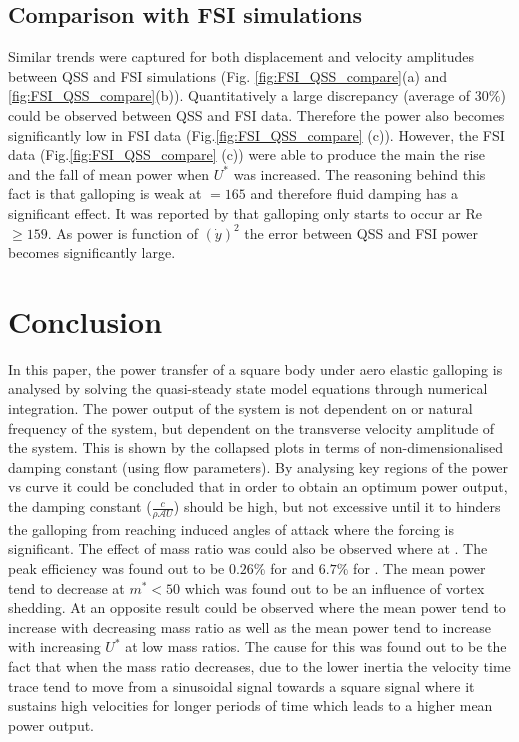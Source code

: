 \subsection{Comparison with FSI simulations}
 Similar trends were captured for both displacement and velocity amplitudes between QSS and FSI simulations (Fig. \ref{fig:FSI_QSS_compare}(a) and \ref{fig:FSI_QSS_compare}(b)). Quantitatively a large discrepancy (average of $30\%$) could be observed between QSS and FSI data. Therefore the power also becomes significantly low in FSI data (Fig.\ref{fig:FSI_QSS_compare} (c)). However, the FSI data (Fig.\ref{fig:FSI_QSS_compare} (c)) were able to produce the main the rise and the fall of mean power when $U^*$ was increased. The reasoning behind this fact is that galloping is weak at \reynoldsnumber$=165$  and therefore fluid damping has a significant effect. It was reported by \cite{Barrero-Gil2009} that galloping only starts to occur ar Re $\geq 159$. As power is function of $(\dot{y})^2$ the error between QSS and FSI power becomes significantly large.  
 

 

\section{Conclusion}

In this paper, the power transfer of a square body under aero elastic galloping is analysed by solving the quasi-steady state model equations through numerical integration. The power output of the system is not dependent on \ustar or natural frequency of the system, but dependent on the transverse velocity amplitude of the system. This is shown by the collapsed plots in terms of non-dimensionalised damping constant (using flow parameters). By analysing key regions of the power vs \ustar curve it could be concluded that in order to obtain an optimum power output, the damping constant ($\frac{c}{\rho\mathcal{A}U}$) should be high, but not excessive until it  to hinders the galloping from reaching induced angles of attack where the forcing is significant. The effect of mass ratio was could also be observed where at . The peak efficiency was found out to be $0.26\%$ for  and $6.7\%$ for . The mean power tend to decrease at $m^*<50$ which was found out to be an influence of vortex shedding. At  an opposite result could be observed where the mean power tend to increase with decreasing mass ratio as well as the mean power tend to increase with increasing $U^*$ at low mass ratios. The cause for this was found out to be the fact that when the mass ratio decreases, due to the lower inertia the velocity time trace tend to move from a sinusoidal signal towards a square signal where it sustains high velocities for longer periods of time which leads to a higher mean power output.






 

 
 
 

 
 



 
 
 
 
 
 
 
 
 
 
  
 
 
